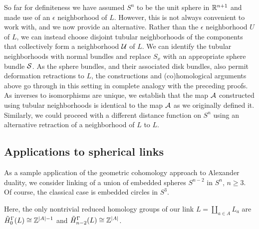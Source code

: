 \begin{comment}
	we need to consider the co-orientation of the the piece of $\bd \mr T$ corresponding to $V^0$.
	We have

	Once again,
	\begin{itemize}
		\item the $V^0$ terms should cancel once I get the signs right,
		\item since $\bd V \in Q^*(S^n-L)$ it follows that $(\bd V)^-$ and $\bd V^0=-(\bd V)^0$ are in $Q^*(S^n-L)$,
		\item and then $\bd V^0 \times [0,1) \in Q^*(S^n-L)$ since the homotopy is universal.
	\end{itemize}
\end{comment}

\begin{remark}\label{R: Alex tubular}
	So far for definiteness we have assumed $S^n$ to be the unit sphere in $\mathbb{R}^{n+1}$ and made use of an $\epsilon$ neighborhood of $L$.
	However, this is not always convenient to work with, and we now provide an alternative.
	Rather than the $\epsilon$ neighborhood $U$ of $L$, we can instead choose disjoint tubular neighborhoods of the components that collectively form a neighborhood $\mathcal{U}$ of $L$.
	We can identify the tubular neighborhoods with normal bundles and replace $S_x$ with an appropriate sphere bundle $\mathcal{S}$.
	As the sphere bundles, and their associated disk bundles, also permit deformation retractions to $L$, the constructions and (co)homological arguments above go through in this setting in complete analogy with the preceding proofs.
	As inverses to isomorphisms are unique, we establish that the map $\mathcal{A}$ constructed using tubular neighborhoods is identical to the map $\mathcal{A}$ as we originally defined it.
	Similarly, we could proceed with a different distance function on $S^n$ using an alternative retraction of a neighborhood of $L$ to $L$.
\end{remark}


\subsection{Applications to spherical links}

As a sample application of the geometric cohomology approach to Alexander duality, we consider linking of a union of embedded spheres $S^{n-2}$ in $S^n$, $n \geq 3$.
Of course, the classical case is embedded circles in $S^3$.

Here, the only nontrivial reduced homology groups of our link $L = \amalg_{a \in A} L_a$ are $\tilde H_0^\Gamma(L) \cong \mathbb{Z}^{|A|-1}$ and $\tilde H_{n-2}^\Gamma(L) \cong \mathbb{Z}^{|A|}$.

